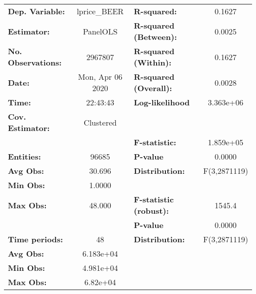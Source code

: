 \documentclass{report}
\begin{document}
\begin{center}
\begin{tabular}{lclc}
\toprule
\textbf{Dep. Variable:}       &    lprice\_BEER    & \textbf{  R-squared:         }   &      0.1627      \\
\textbf{Estimator:}           &      PanelOLS      & \textbf{  R-squared (Between):}  &      0.0025      \\
\textbf{No. Observations:}    &      2967807       & \textbf{  R-squared (Within):}   &      0.1627      \\
\textbf{Date:}                &  Mon, Apr 06 2020  & \textbf{  R-squared (Overall):}  &      0.0028      \\
\textbf{Time:}                &      22:43:43      & \textbf{  Log-likelihood     }   &    3.363e+06     \\
\textbf{Cov. Estimator:}      &     Clustered      & \textbf{                     }   &                  \\
\textbf{}                     &                    & \textbf{  F-statistic:       }   &    1.859e+05     \\
\textbf{Entities:}            &       96685        & \textbf{  P-value            }   &      0.0000      \\
\textbf{Avg Obs:}             &       30.696       & \textbf{  Distribution:      }   &   F(3,2871119)   \\
\textbf{Min Obs:}             &       1.0000       & \textbf{                     }   &                  \\
\textbf{Max Obs:}             &       48.000       & \textbf{  F-statistic (robust):} &      1545.4      \\
\textbf{}                     &                    & \textbf{  P-value            }   &      0.0000      \\
\textbf{Time periods:}        &         48         & \textbf{  Distribution:      }   &   F(3,2871119)   \\
\textbf{Avg Obs:}             &     6.183e+04      & \textbf{                     }   &                  \\
\textbf{Min Obs:}             &     4.981e+04      & \textbf{                     }   &                  \\
\textbf{Max Obs:}             &      6.82e+04      & \textbf{                     }   &                  \\
\bottomrule
\end{tabular}
\begin{tabular}{lcccccc}

\end{tabular}
\end{center}
\end{document}
